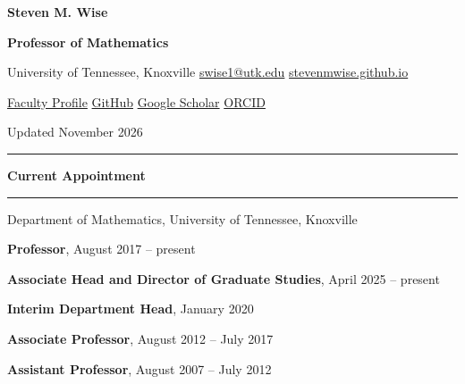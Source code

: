 \documentclass[10pt,letterpaper]{article}
\newcommand{\cvsection}[1]{%
  \Needspace{5\baselineskip}\par\vspace{13pt}%
  {\color{Smokey}\fontsize{15}{17}\selectfont\bfseries #1}\par\vspace{3pt}%
  {\color{UTOrange}\rule{\linewidth}{1.8pt}}\par\vspace{4pt}%
}
\begin{document}
\begin{minipage}[c]{0.79\textwidth}
  {\color{Smokey}\fontsize{28}{31}\selectfont\bfseries Steven M. Wise}\par
  \vspace{2pt}
  {\color{UTOrange}\fontsize{13}{16}\selectfont\bfseries Professor of Mathematics}\par
  \vspace{7pt}
  {\small
  University of Tennessee, Knoxville \textcolor{UTOrange}{\textbullet}
  \href{mailto:swise1@utk.edu}{swise1@utk.edu} \textcolor{UTOrange}{\textbullet}
  \href{https://stevenmwise.github.io}{stevenmwise.github.io}\par
  \href{https://faculty.utk.edu/Steven.Wise}{Faculty Profile} \textcolor{UTOrange}{\textbullet}
  \href{https://github.com/stevenmwise}{GitHub} \textcolor{UTOrange}{\textbullet}
  \href{https://scholar.google.com/citations?user=dGv7Ou8AAAAJ}{Google Scholar} \textcolor{UTOrange}{\textbullet}
  \href{https://orcid.org/0000-0003-3824-2075}{ORCID}\par
  \textcolor{WarmGray}{Updated November 2026}}
\end{minipage}%
\hfill
\begin{minipage}[c]{0.16\textwidth}
  \raggedleft\colorbox{PaleOrange}{\hspace{4pt}\hspace{4pt}}
\end{minipage}

\vspace{8pt}
{\color{RuleGray}\rule{\linewidth}{0.6pt}}

\cvsection{Current Appointment}
    \begin{description}
    \item
Department of Mathematics, University of Tennessee, Knoxville
	\begin{description}
	\item
\textbf{Professor}, August 2017 -- present
	\item
\textbf{Associate Head and Director of Graduate Studies}, April 2025 -- present
	\item
\textbf{Interim Department Head}, January 2020
	\item
\textbf{Associate Professor}, August 2012 -- July 2017
	\item
\textbf{Assistant Professor}, August 2007 -- July 2012
	\end{description}
	\end{description}
	
\end{document}
